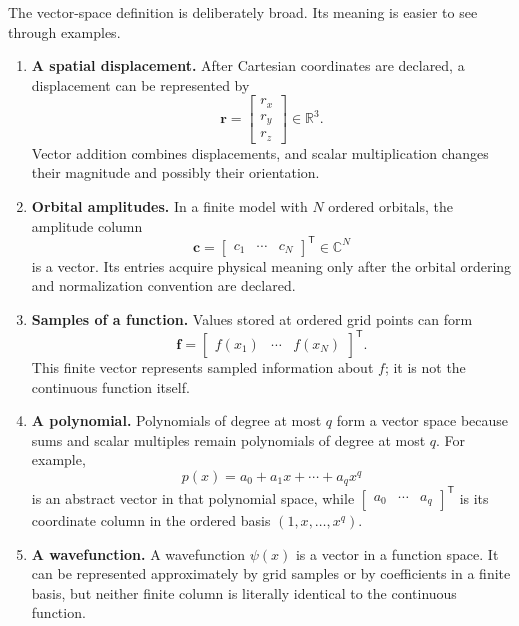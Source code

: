 The vector-space definition is deliberately broad. Its meaning is easier to
see through examples.

\begin{enumerate}
  \item \textbf{A spatial displacement.}
        After Cartesian coordinates are declared, a displacement can be
        represented by
        \begin{equation}
          \mathbf r=\begin{bmatrix}r_x\\r_y\\r_z\end{bmatrix}
          \in\mathbb R^3.
        \end{equation}
        Vector addition combines displacements, and scalar multiplication
        changes their magnitude and possibly their orientation.

  \item \textbf{Orbital amplitudes.}
        In a finite model with \(N\) ordered orbitals, the amplitude column
        \begin{equation}
          \mathbf c
          =\begin{bmatrix}c_1&\cdots&c_N\end{bmatrix}^{\mathsf T}
          \in\mathbb C^N
        \end{equation}
        is a vector. Its entries acquire physical meaning only after the
        orbital ordering and normalization convention are declared.

  \item \textbf{Samples of a function.}
        Values stored at ordered grid points can form
        \begin{equation}
          \mathbf f
          =\begin{bmatrix}f(x_1)&\cdots&f(x_N)\end{bmatrix}^{\mathsf T}.
        \end{equation}
        This finite vector represents sampled information about \(f\); it is
        not the continuous function itself.

  \item \textbf{A polynomial.}
        Polynomials of degree at most \(q\) form a vector space because sums
        and scalar multiples remain polynomials of degree at most \(q\). For
        example,
        \begin{equation}
          p(x)=a_0+a_1x+\cdots+a_qx^q
        \end{equation}
        is an abstract vector in that polynomial space, while
        \(\begin{bmatrix}a_0&\cdots&a_q\end{bmatrix}^{\mathsf T}\) is its
        coordinate column in the ordered basis \((1,x,\ldots,x^q)\).

  \item \textbf{A wavefunction.}
        A wavefunction \(\psi(x)\) is a vector in a function space. It can be
        represented approximately by grid samples or by coefficients in a
        finite basis, but neither finite column is literally identical to the
        continuous function.
\end{enumerate}


